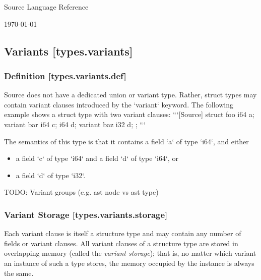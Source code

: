 \documentclass[a4paper, 12pt, oneside, final]{article}
\makeatletter
\def\section{\@startsection{section}{1}{0mm}{-3.5ex}{3.5ex}{\normalfont\fontsize{24pt}{36pt}\selectfont}}
\makeatother
\begin{document}
\begingroup
    \parindent=0pt
    \centering
    \fontsize{36pt}{48pt}\selectfont Source Language Reference \par \bigskip\bigskip
    \Large \today \par
\endgroup

\tableofcontents
\clearpage

\section{Type System [types]}
\subsection{Variants [types.variants]}
\subsubsection{Definition [types.variants.def]}
Source does not have a dedicated union or variant type. Rather, struct types may contain variant clauses
introduced by the `variant` keyword. The following example shows a struct type with two variant clauses:
```[Source]
struct foo {
    i64 a;
    variant bar { i64 c; i64 d; }
    variant baz { i32 d; }
};
```

The semantics of this type is that it contains a field `a` of type `i64`, and either
\begin{itemize}
    \item a field `c` of type `i64` and a field `d` of type `i64`, or
    \item a field `d` of type `i32`.
\end{itemize}

TODO: Variant groups (e.g. ast node vs ast type)

\subsubsection{Variant Storage [types.variants.storage]}
Each variant clause is itself a structure type and may contain any number of fields or variant clauses. All
variant clauses of a structure type are stored in overlapping memory (called the \emph{variant storage}); that is,
no matter which variant an instance of such a type stores, the memory occupied by the instance is always the same.
\end{document}
